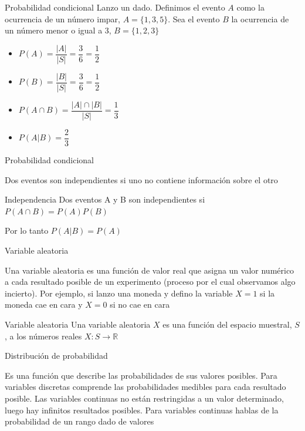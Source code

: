 \documentclass{beamer}
\begin{document}
\begin{frame}{Probabilidad condicional}
    Lanzo un dado. Definimos el evento $A$ como la ocurrencia de un número impar, $A=\{1,3,5\}$. Sea el evento $B$ la ocurrencia de un número menor o igual a 3, $B=\{1,2,3\}$

    \begin{itemize}
        \item $P(A)=\dfrac{|A|}{|S|}=\dfrac{3}{6}=\dfrac{1}{2}$
        \item $P(B)=\dfrac{|B|}{|S|}=\dfrac{3}{6}=\dfrac{1}{2}$
        \item $P(A\cap B)=\dfrac{|A|\cap |B|}{|S|}=\dfrac{1}{3}$
        \item $P(A|B)=\dfrac{2}{3}$
    \end{itemize}
\end{frame}

\begin{frame}{Probabilidad condicional}

Dos eventos son independientes si uno no contiene información sobre el otro
\vspace{2mm}
\begin{block}{Independencia}
Dos eventos A y B son independientes si $P(A\cap B)=P(A)P(B)$
\end{block}

Por lo tanto $P(A|B)=P(A)$
  
\end{frame}

\begin{frame}{Variable aleatoria}

Una variable aleatoria es una función de valor real que asigna un valor numérico a cada resultado posible de un experimento (proceso por el cual observamos algo incierto). Por ejemplo, si lanzo una moneda y defino la variable $X=1$ si la moneda cae en cara y $X=0$ si no cae en cara

\vspace{2mm}

\begin{block}{Variable aleatoria}
Una variable aleatoria $X$ es una función del espacio muestral, $S$, a los números reales
$X:S\rightarrow \mathbb{R}$
    
\end{block}
    
\end{frame}

\begin{frame}{Distribución de probabilidad}

Es una función que describe las probabilidades de sus valores posibles. Para variables discretas comprende las probabilidades medibles para cada resultado posible. Las variables continuas no están restringidas a un valor determinado, luego hay infinitos resultados posibles. Para variables continuas hablas de la probabilidad de un rango dado de valores
    
\end{frame}
\end{document}
